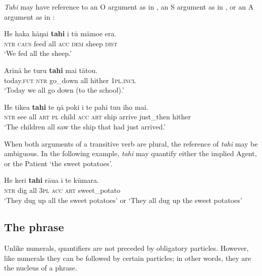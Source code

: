 \textit{Tahi} may have reference to an O argument as in , an S argument as in , or an A argument as in :

\ea\label{ex:4.117}
\gll He haka hāŋai \textbf{tahi} i tū māmoe era. \\
\textsc{ntr} \textsc{caus} feed all \textsc{acc} \textsc{dem} sheep \textsc{dist} \\

\glt 
‘We fed all the sheep.’ \textstyleExampleref{[R131.008]} 
\z

\ea\label{ex:4.118}
\gll {\ꞌ}Arīnā he turu \textbf{tahi} mai tātou. \\
today.\textsc{fut} \textsc{ntr} go\_down all hither \textsc{1pl.incl} \\

\glt 
‘Today we all go down (to the school).’ \textstyleExampleref{[R315.384]} 
\z

\ea\label{ex:4.119}
\gll He tike{\ꞌ}a \textbf{tahi} te ŋā poki i te pahī tu{\ꞌ}u iho mai. \\
\textsc{ntr} see all \textsc{art} \textsc{pl} child \textsc{acc} \textsc{art} ship arrive just\_then hither \\

\glt
‘The children all saw the ship that had just arrived.’ \textstyleExampleref{[Notes]}
\z

When both arguments of a transitive verb are plural, the reference of \textit{tahi} may be ambiguous. In the following example, \textit{tahi} may quantify either the implied Agent, or the Patient ‘the sweet potatoes’.

\ea\label{ex:4.120}
\gll He keri \textbf{tahi} rāua i te kūmara. \\
\textsc{ntr} dig all \textsc{3pl} \textsc{acc} \textsc{art} sweet\_potato \\

\glt 
‘They dug up all the sweet potatoes’ or ‘They all dug up the sweet potatoes’ \textstyleExampleref{[Notes]}
\z

\subsection{The  phrase}\label{sec:4.4.10}
Unlike numerals, quantifiers are not preceded by obligatory particles. However, like numerals they can be followed by certain particles; in other words, they are the nucleus of a  phrase.


